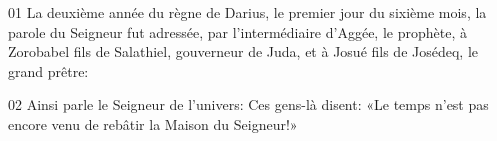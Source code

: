 01 La deuxième année du règne de Darius, le premier jour du sixième mois, la parole du Seigneur fut adressée, par l’intermédiaire d’Aggée, le prophète, à Zorobabel fils de Salathiel, gouverneur de Juda, et à Josué fils de Josédeq, le grand prêtre:

02 Ainsi parle le Seigneur de l’univers: Ces gens-là disent: «Le temps n’est pas encore venu de rebâtir la Maison du Seigneur!»
